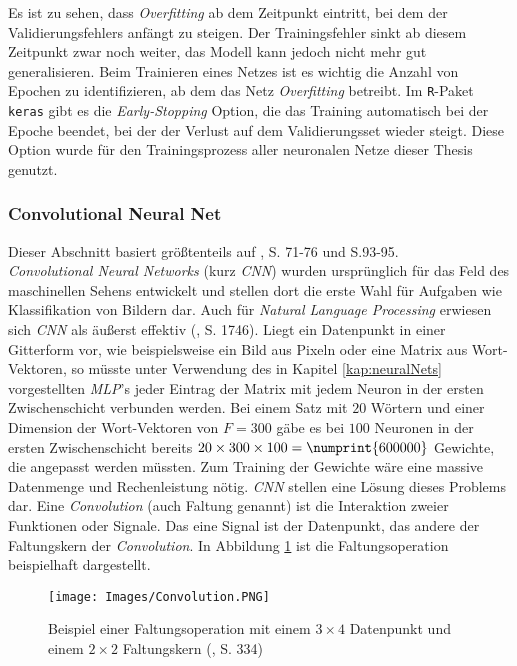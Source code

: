 \documentclass[a4paper,11pt]{article}
\begin{document}
Es ist zu sehen, dass \textit{Overfitting} ab dem Zeitpunkt eintritt, bei dem der Validierungsfehlers anfängt zu steigen. Der Trainingsfehler sinkt ab diesem Zeitpunkt zwar noch weiter, das Modell kann jedoch nicht mehr gut generalisieren. Beim Trainieren eines Netzes ist es wichtig die Anzahl von Epochen zu identifizieren, ab dem das Netz \textit{Overfitting} betreibt. Im \texttt{R}-Paket \texttt{keras} gibt es die \textit{Early-Stopping} Option, die das Training automatisch bei der Epoche beendet, bei der der Verlust auf dem Validierungsset wieder steigt. Diese Option wurde für den Trainingsprozess aller neuronalen Netze dieser Thesis genutzt.


\subsubsection{Convolutional Neural Net} \label{kap:CNN}

Dieser Abschnitt basiert größtenteils auf \cite{deepEssentials}, S. 71-76 und S.93-95.\\
\textit{Convolutional Neural Networks} (kurz \textit{CNN}) wurden ursprünglich für das Feld des maschinellen Sehens entwickelt und stellen dort die erste Wahl für Aufgaben wie Klassifikation von Bildern dar. Auch für \textit{Natural Language Processing} erwiesen sich \textit{CNN} als äußerst effektiv (\cite{cnnSentence}, S. 1746). Liegt ein Datenpunkt in einer Gitterform vor, wie beispielsweise ein Bild aus Pixeln oder eine Matrix aus Wort-Vektoren, so müsste unter Verwendung des in Kapitel \ref{kap:neuralNets} vorgestellten \textit{MLP}'s jeder Eintrag der Matrix mit jedem Neuron in der ersten Zwischenschicht verbunden werden. Bei einem Satz mit $20$ Wörtern und einer Dimension der Wort-Vektoren von $F = 300$ gäbe es bei $100$ Neuronen in der ersten Zwischenschicht bereits $20 \times 300 \times 100  = \numprint{600000}$ Gewichte, die angepasst werden müssten. Zum Training der Gewichte wäre eine massive Datenmenge und Rechenleistung nötig. \textit{CNN} stellen eine Lösung dieses Problems dar. Eine \textit{Convolution} (auch Faltung genannt) ist die Interaktion zweier Funktionen oder Signale. Das eine Signal ist der Datenpunkt, das andere der Faltungskern der \textit{Convolution}. In Abbildung \ref{abb:Convolution} ist die Faltungsoperation beispielhaft dargestellt.


\begin{figure}[!ht]
\begin{center}
\texttt{[image: Images/Convolution.PNG]}
\caption{Beispiel einer Faltungsoperation mit einem $3 \times 4$ Datenpunkt und einem $2 \times 2$ Faltungskern (\cite{deepL}, S. 334)}
\label{abb:Convolution}
\end{center}
\end{figure}
\end{document}

